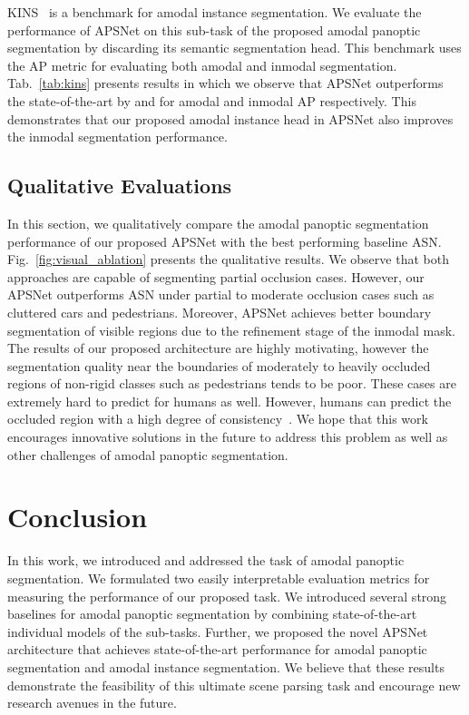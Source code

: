 \documentclass[10pt,twocolumn,letterpaper]{article}
\newcommand{\figref}[1]{Fig.~\ref{#1}}
\newcommand{\tabref}[1]{Tab.~\ref{#1}}
\begin{document}
KINS~\cite{qi2019amodal} is a benchmark for amodal instance segmentation. We evaluate the performance of \mbox{APSNet} on this sub-task of the proposed amodal panoptic segmentation by discarding its semantic segmentation head. This benchmark uses the AP metric for evaluating both amodal and inmodal segmentation. \tabref{tab:kins} presents results in which we observe that \mbox{APSNet} outperforms the state-of-the-art by  and  for amodal and inmodal AP respectively. This demonstrates that our proposed amodal instance head in \mbox{APSNet} also improves the inmodal segmentation performance.

\subsection{Qualitative Evaluations}
\label{sec:qualitative}

In this section, we qualitatively compare the amodal panoptic segmentation performance of our proposed \mbox{APSNet} with the best performing baseline ASN. \figref{fig:visual_ablation} presents the qualitative results. We observe that both approaches are capable of segmenting partial occlusion cases. However, our \mbox{APSNet} outperforms ASN under partial to moderate occlusion cases such as cluttered cars and pedestrians. Moreover, \mbox{APSNet} achieves better boundary segmentation of visible regions due to the refinement stage of the inmodal mask. The results of our proposed architecture are highly motivating, however the segmentation quality near the boundaries of moderately to heavily occluded regions of non-rigid classes such as pedestrians tends to be poor. These cases are extremely hard to predict for humans as well. However, humans can predict the occluded region with a high degree of consistency~\cite{zhu2017semantic}. We hope that this work encourages innovative solutions in the future to address this problem as well as other challenges of amodal panoptic segmentation.






 
\section{Conclusion}
In this work, we introduced and addressed the task of amodal panoptic segmentation. We formulated two easily interpretable evaluation metrics for measuring the performance of our proposed task. We introduced several strong baselines for amodal panoptic segmentation by combining state-of-the-art individual models of the sub-tasks. Further, we proposed the novel \mbox{APSNet} architecture that achieves state-of-the-art performance for amodal panoptic segmentation and amodal instance segmentation. We believe that these results demonstrate the feasibility of this ultimate scene parsing task and encourage new research avenues in the future. 
\end{document}
